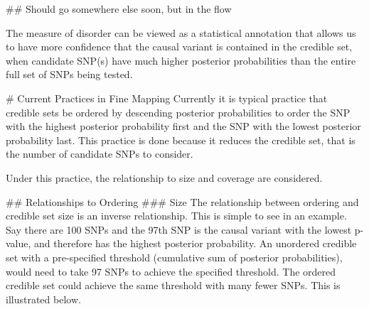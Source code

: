 ## Should go somewhere else soon, but in the flow 

The measure of disorder can be viewed as a statistical annotation that allows us to have more confidence that the causal variant is contained in the credible set, when candidate SNP(s) have much higher posterior probabilities than the entire full set of SNPs being tested. 

# Current Practices in Fine Mapping 
Currently it is typical practice that credible sets be ordered by descending posterior probabilities to order the SNP with the highest posterior probability first and the SNP with the lowest posterior probability last. This practice is done because it reduces the credible set, that is the number of candidate SNPs to consider. 

Under this practice, the relationship to size and coverage are considered. 

## Relationships to Ordering 
### Size
The relationship between ordering and credible set size is an inverse relationship. This is simple to see in an example. Say there are 100 SNPs and the 97th SNP is the causal variant with the lowest p-value, and therefore has the highest posterior probability. An unordered credible set with a pre-specified threshold (cumulative sum of posterior probabilities), would need to take 97 SNPs to achieve the specified threshold. The ordered credible set could achieve the same threshold with many fewer SNPs. This is illustrated below.